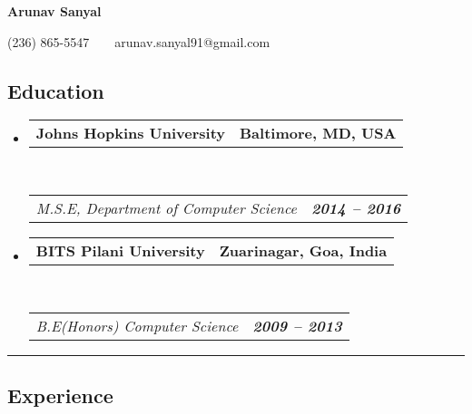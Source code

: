 \documentclass[10pt,letterpaper]{article}
\makeatletter
\newcommand{\headerrow}[2]
{\begin{tabular*}{\linewidth}{l@{\extracolsep{\fill}}r}
	#1 &
	#2 \\
\end{tabular*}}
\makeatother
\begin{document}
\pagestyle{empty}

\begin{center}
{\LARGE \textbf{Arunav Sanyal}}

(236) 865-5547\ \
\ \ arunav.sanyal91@gmail.com
\end{center}


\subsection*{Education}

\begin{itemize}
	\parskip=0.1em

	\item 
	\headerrow
		{\textbf{Johns Hopkins University}}
		{\textbf{Baltimore, MD, USA}}
	\\
	\headerrow
		{\emph{M.S.E, Department of Computer Science}}
		{\emph{\textbf{2014 -- 2016}}}
	
	\item 
		\headerrow
			{\textbf{BITS Pilani University}}
			{\textbf{Zuarinagar, Goa, India}}
		\\
		\headerrow
			{\emph{B.E(Honors) Computer Science}}
			{\emph{\textbf{2009 -- 2013}}}

\end{itemize}

\hrule
\vspace{-0.4em}
\subsection*{Experience}
\end{document}

